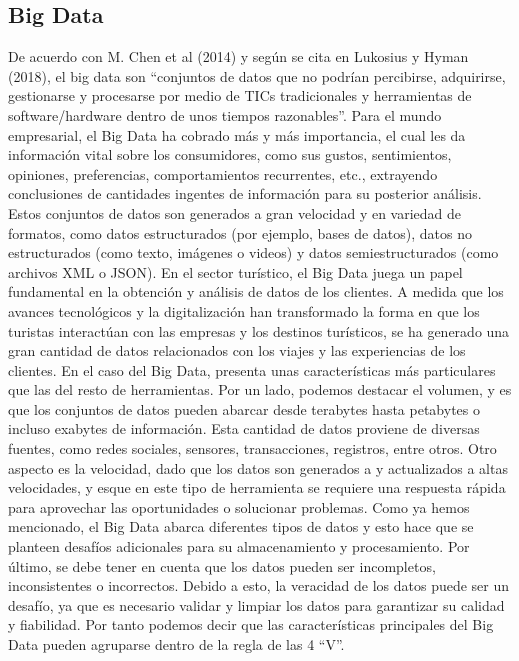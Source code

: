 \documentclass[
  letterpaper,
  DIV=11,
  numbers=noendperiod]{scrreprt}
\begin{document}
\hypertarget{big-data}{%
\subsection{Big Data}\label{big-data}}

De acuerdo con M. Chen et al (2014) y según se cita en Lukosius y Hyman
(2018), el big data son ``conjuntos de datos que no podrían percibirse,
adquirirse, gestionarse y procesarse por medio de TICs tradicionales y
herramientas de software/hardware dentro de unos tiempos razonables''.
Para el mundo empresarial, el Big Data ha cobrado más y más importancia,
el cual les da información vital sobre los consumidores, como sus
gustos, sentimientos, opiniones, preferencias, comportamientos
recurrentes, etc., extrayendo conclusiones de cantidades ingentes de
información para su posterior análisis. Estos conjuntos de datos son
generados a gran velocidad y en variedad de formatos, como datos
estructurados (por ejemplo, bases de datos), datos no estructurados
(como texto, imágenes o videos) y datos semiestructurados (como archivos
XML o JSON). En el sector turístico, el Big Data juega un papel
fundamental en la obtención y análisis de datos de los clientes. A
medida que los avances tecnológicos y la digitalización han transformado
la forma en que los turistas interactúan con las empresas y los destinos
turísticos, se ha generado una gran cantidad de datos relacionados con
los viajes y las experiencias de los clientes. En el caso del Big Data,
presenta unas características más particulares que las del resto de
herramientas. Por un lado, podemos destacar el volumen, y es que los
conjuntos de datos pueden abarcar desde terabytes hasta petabytes o
incluso exabytes de información. Esta cantidad de datos proviene de
diversas fuentes, como redes sociales, sensores, transacciones,
registros, entre otros. Otro aspecto es la velocidad, dado que los datos
son generados a y actualizados a altas velocidades, y esque en este tipo
de herramienta se requiere una respuesta rápida para aprovechar las
oportunidades o solucionar problemas. Como ya hemos mencionado, el Big
Data abarca diferentes tipos de datos y esto hace que se planteen
desafíos adicionales para su almacenamiento y procesamiento. Por último,
se debe tener en cuenta que los datos pueden ser incompletos,
inconsistentes o incorrectos. Debido a esto, la veracidad de los datos
puede ser un desafío, ya que es necesario validar y limpiar los datos
para garantizar su calidad y fiabilidad. Por tanto podemos decir que las
características principales del Big Data pueden agruparse dentro de la
regla de las 4 ``V''.
\end{document}

